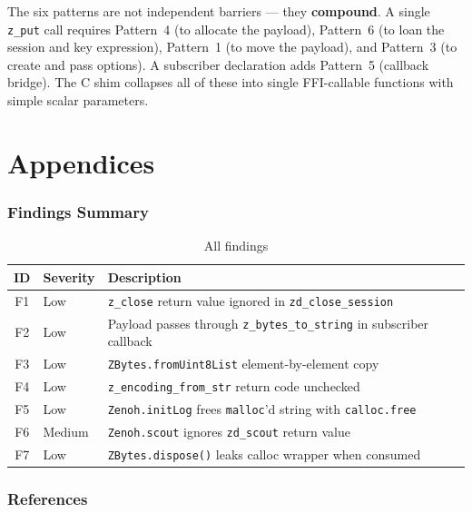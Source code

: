 \documentclass[11pt,a4paper]{article}
\newcommand{\code}[1]{\texttt{#1}}
\newcommand{\fn}[1]{\texttt{#1}}
\begin{document}
\begin{patternbox}
The six patterns are not independent barriers --- they \textbf{compound}.
A single \fn{z\_put} call requires Pattern~4 (to allocate the payload),
Pattern~6 (to loan the session and key expression), Pattern~1 (to move the
payload), and Pattern~3 (to create and pass options). A subscriber
declaration adds Pattern~5 (callback bridge). The C shim collapses all of
these into single FFI-callable functions with simple scalar parameters.
\end{patternbox}


\clearpage
\appendix
\part*{Appendices}

\section{Findings Summary}
\label{app:findings}

\begin{table}[ht]
\centering\small
\begin{tabularx}{\textwidth}{clL}
  \toprule
  \textbf{ID} & \textbf{Severity} & \textbf{Description} \\
  \midrule
  F1 & Low    & \fn{z\_close} return value ignored in \fn{zd\_close\_session} \\
  F2 & Low    & Payload passes through \fn{z\_bytes\_to\_string} in subscriber callback \\
  F3 & Low    & \code{ZBytes.fromUint8List} element-by-element copy \\
  F4 & Low    & \fn{z\_encoding\_from\_str} return code unchecked \\
  F5 & Low    & \fn{Zenoh.initLog} frees \code{malloc}'d string with \code{calloc.free} \\
  F6 & Medium & \fn{Zenoh.scout} ignores \fn{zd\_scout} return value \\
  F7 & Low    & \code{ZBytes.dispose()} leaks calloc wrapper when consumed \\
  \bottomrule
\end{tabularx}
\caption{All findings}
\label{tab:findings}
\end{table}


\section{References}
\label{app:references}
\end{document}
